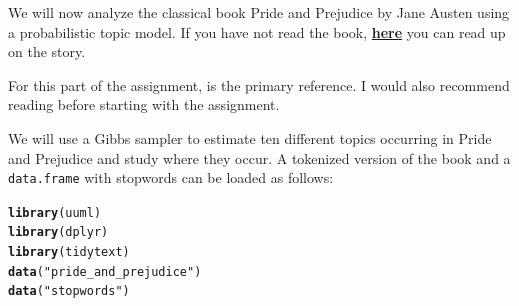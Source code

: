 \documentclass[11pt,a4paper,english]{article}\usepackage[]{graphicx}\usepackage[]{xcolor}
\makeatletter
\newcommand{\hlsng}[1]{\textcolor[rgb]{0.192,0.494,0.8}{#1}}%
\newcommand{\hldef}[1]{\textcolor[rgb]{0.345,0.345,0.345}{#1}}%
\newcommand{\hlkwd}[1]{\textcolor[rgb]{0.737,0.353,0.396}{\textbf{#1}}}%
\newenvironment{kframe}{%
 \def\at@end@of@kframe{}%
 \ifinner\ifhmode%
  \def\at@end@of@kframe{\end{minipage}}%
  \begin{minipage}{\columnwidth}%
 \fi\fi%
 \def\FrameCommand##1{\hskip\@totalleftmargin \hskip-\fboxsep
 \colorbox{shadecolor}{##1}\hskip-\fboxsep
     \hskip-\linewidth \hskip-\@totalleftmargin \hskip\columnwidth}%
 \MakeFramed {\advance\hsize-\width
   \@totalleftmargin\z@ \linewidth\hsize
   \@setminipage}}%
 {\par\unskip\endMakeFramed%
 \at@end@of@kframe}
\newenvironment{knitrout}{}{} %
\makeatother
\begin{document}
We will now analyze the classical book Pride and Prejudice by Jane Austen using a probabilistic topic model. If you have not read the book, \href{https://en.wikipedia.org/wiki/Pride_and_Prejudice}{\textbf{here}} you can read up on the story.

For this part of the assignment, \citet{griffiths2004finding} is the primary reference. I would also recommend reading \citet{blei2012probabilistic} before starting with the assignment.

We will use a Gibbs sampler to estimate ten different topics occurring in Pride and Prejudice and study where they occur. A tokenized version of the book and a \texttt{data.frame} with stopwords can be loaded as follows:

\begin{knitrout}\small
{}\color{fgcolor}\begin{kframe}
\begin{alltt}
\hlkwd{library}\hldef{(uuml)}
\hlkwd{library}\hldef{(dplyr)}
\hlkwd{library}\hldef{(tidytext)}
\hlkwd{data}\hldef{(}\hlsng{"pride_and_prejudice"}\hldef{)}
\hlkwd{data}\hldef{(}\hlsng{"stopwords"}\hldef{)}
\end{alltt}
\end{kframe}
\end{knitrout}
\end{document}

